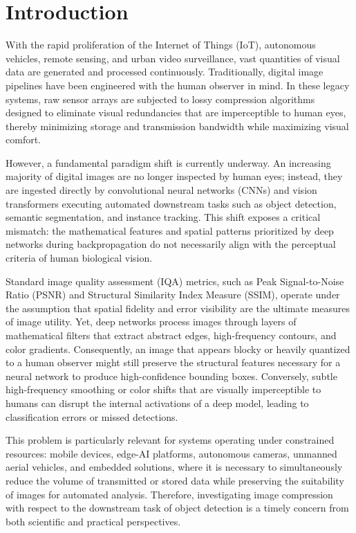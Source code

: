 \documentclass[12pt, a4paper]{article}
\begin{document}
\section{Introduction}
With the rapid proliferation of the Internet of Things (IoT), autonomous vehicles, remote sensing, and urban video surveillance, vast quantities of visual data are generated and processed continuously. Traditionally, digital image pipelines have been engineered with the human observer in mind. In these legacy systems, raw sensor arrays are subjected to lossy compression algorithms designed to eliminate visual redundancies that are imperceptible to human eyes, thereby minimizing storage and transmission bandwidth while maximizing visual comfort. 

However, a fundamental paradigm shift is currently underway. An increasing majority of digital images are no longer inspected by human eyes; instead, they are ingested directly by convolutional neural networks (CNNs) and vision transformers executing automated downstream tasks such as object detection, semantic segmentation, and instance tracking. This shift exposes a critical mismatch: the mathematical features and spatial patterns prioritized by deep networks during backpropagation do not necessarily align with the perceptual criteria of human biological vision.

Standard image quality assessment (IQA) metrics, such as Peak Signal-to-Noise Ratio (PSNR) and Structural Similarity Index Measure (SSIM), operate under the assumption that spatial fidelity and error visibility are the ultimate measures of image utility. Yet, deep networks process images through layers of mathematical filters that extract abstract edges, high-frequency contours, and color gradients. Consequently, an image that appears blocky or heavily quantized to a human observer might still preserve the structural features necessary for a neural network to produce high-confidence bounding boxes. Conversely, subtle high-frequency smoothing or color shifts that are visually imperceptible to humans can disrupt the internal activations of a deep model, leading to classification errors or missed detections.

This problem is particularly relevant for systems operating under constrained resources: mobile devices, edge-AI platforms, autonomous cameras, unmanned aerial vehicles, and embedded solutions, where it is necessary to simultaneously reduce the volume of transmitted or stored data while preserving the suitability of images for automated analysis. Therefore, investigating image compression with respect to the downstream task of object detection is a timely concern from both scientific and practical perspectives.
\end{document}
